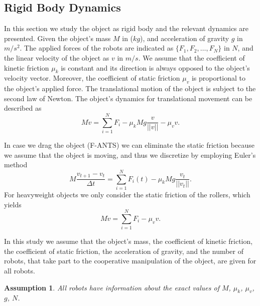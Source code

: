 \documentclass[letterpaper, 10 pt, conference]{ieeeconf}
\newtheorem{assumption}{\textbf{Assumption}}
\begin{document}
\subsection{Rigid Body Dynamics}\label{rbd}
In this section we study the object as rigid body and the relevant dynamics are presented. Given the object's mass $M$ in ($kg$), and acceleration of gravity $g$ in $m/s^2$. The applied forces of the robots are indicated as $\{ F_1, F_2, \hdots, F_N \}$ in $N$, and the linear velocity of the object as $v$ in $m/s$. We assume that the coefficient of kinetic friction $\mu_k$ is constant and its direction is always opposed to the object's velocity vector. Moreover, the coefficient of static friction $\mu_v$ is proportional to the object's applied force. The translational motion of the object is subject to the second law of Newton. The object's dynamics for translational movement can be described as 
\begin{equation}
M\dot{v}=\sum_{i=1}^N F_i-\mu_{k}Mg\frac{v}{||v||}-\mu_v v.
\end{equation}

In case we drag the object (F-ANTS) we can eliminate the static friction because we assume that the object is moving, and thus we discretize by employing Euler's method 
\begin{equation}\label{dod}
M\frac{v_{t+1}-v_t}{\Delta t}=\sum_{i=1}^N F_i(t)-\mu_kMg\frac{v_t}{||v_t||}.
\end{equation}
For heavyweight objects we only consider the static friction of the rollers, which yields 
\begin{equation}\label{roldyn}
M\dot{v}=\sum_{i=1}^N F_i-\mu_v v.
\end{equation}

In this study we assume that the object's mass, the coefficient of kinetic friction, the coefficient of static friction, the acceleration of gravity, and the number of robots, that take part to the cooperative manipulation of the object, are given for all robots.
\begin{assumption}\label{as1}
\textit{All robots have information about the exact values of $M$, $\mu_k$, $\mu_v$, $g$, $N$.}
\end{assumption}
 
\end{document}
